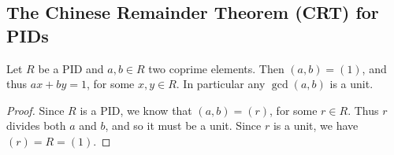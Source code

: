 \documentclass[10pt, a4paper]{article}
\begin{document}
\subsection{The Chinese Remainder Theorem
    (CRT)
    for PIDs}

\begin{lemma}
    Let $R$ be a PID and $a, b \in R$ two coprime elements.
    Then $(a, b) = (1)$,
    and thus $ax + by = 1$,
    for some $x, y \in R$.
    In particular any $\gcd(a, b)$ is a unit.

    \begin{proof}
        Since $R$ is a PID,
        we know that $(a, b) = (r)$,
        for some $r \in R$.
        Thus $r$ divides both $a$ and $b$,
        and so it must be a unit.
        Since $r$ is a unit,
        we have $(r) = R = (1)$.
    \end{proof}
\end{lemma}
\end{document}
